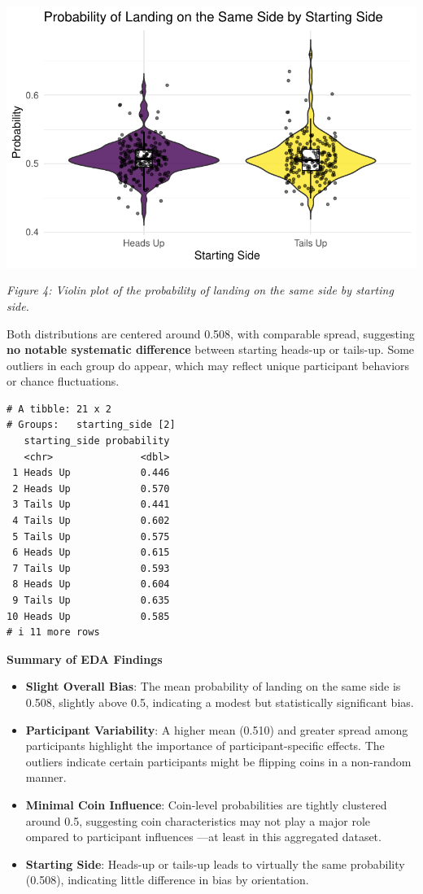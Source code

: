 \documentclass[
  letterpaper,
  DIV=11,
  numbers=noendperiod]{scrartcl}
\begin{document}
\includegraphics{Garcia-Vuksic-RMProject-2024_files/figure-pdf/unnamed-chunk-14-1.pdf}

\emph{Figure 4: Violin plot of the probability of landing on the same
side by starting side.}

Both distributions are centered around 0.508, with comparable spread,
suggesting \textbf{no notable systematic difference} between starting
heads-up or tails-up. Some outliers in each group do appear, which may
reflect unique participant behaviors or chance fluctuations.

\begin{verbatim}
# A tibble: 21 x 2
# Groups:   starting_side [2]
   starting_side probability
   <chr>               <dbl>
 1 Heads Up            0.446
 2 Heads Up            0.570
 3 Tails Up            0.441
 4 Tails Up            0.602
 5 Tails Up            0.575
 6 Heads Up            0.615
 7 Tails Up            0.593
 8 Heads Up            0.604
 9 Tails Up            0.635
10 Heads Up            0.585
# i 11 more rows
\end{verbatim}

\textbf{Summary of EDA Findings}

\begin{itemize}
\item
  \textbf{Slight Overall Bias}: The mean probability of landing on the
  same side is 0.508, slightly above 0.5, indicating a modest but
  statistically significant bias.
\item
  \textbf{Participant Variability}: A higher mean (0.510) and greater
  spread among participants highlight the importance of
  participant-specific effects. The outliers indicate certain
  participants might be flipping coins in a non-random manner.
\item
  \textbf{Minimal Coin Influence}: Coin-level probabilities are tightly
  clustered around 0.5, suggesting coin characteristics may not play a
  major role ompared to participant influences ---at least in this
  aggregated dataset.
\item
  \textbf{Starting Side}: Heads-up or tails-up leads to virtually the
  same probability (0.508), indicating little difference in bias by
  orientation.
\end{itemize}
\end{document}
